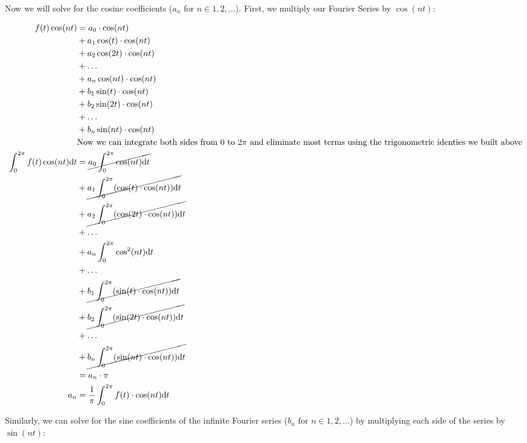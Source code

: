 \documentclass[10pt]{article} %
\begin{document}
Now we will solve for the cosine coefficients ($a_n \text{ for } n \in 1, 2, \dots$). First, we multiply our Fourier Series by $\cos(nt)$:

\begin{align}
    f(t)\cos(nt) & = a_0 \cdot \cos(nt) \\& + a_1\cos(t) \cdot \cos(nt) \\& + a_2\cos(2t) \cdot \cos(nt) \\& + \dots \\& + a_n\cos(nt) \cdot \cos(nt) \\& + b_1\sin(t) \cdot \cos(nt) \\& + b_2\sin(2t) \cdot \cos(nt) \\& + \dots \\& + b_n\sin(nt) \cdot \cos(nt)\\
    &\text{Now we can integrate both sides from $0$ to $2\pi$ and eliminate most terms using the trigonometric identies we built above}\\
    \int_0^{2\pi}f(t)\cos(nt)\mathrm{d}t & = \cancel{a_0 \int_0^{2\pi} \cos(nt) \mathrm{d}t} \\& + \cancel{a_1\int_0^{2\pi}(\cos(t) \cdot \cos(nt)) \mathrm{d}t} \\& + \cancel{a_2\int_0^{2\pi}(\cos(2t) \cdot \cos(nt)) \mathrm{d}t} \\& + \dots \\& + a_n\int_0^{2\pi} \cos^2(nt) \mathrm{d}t \\& + \dots \\& + \cancel{b_1\int_0^{2\pi}(\sin(t) \cdot \cos(nt)) \mathrm{d}t} \\& + \cancel{b_2\int_0^{2\pi}(\sin(2t) \cdot \cos(nt)) \mathrm{d}t} \\& + \dots \\& + \cancel{b_n\int_0^{2\pi}(\sin(nt) \cdot \cos(nt)) \mathrm{d}t}\\
    & = a_n \cdot \pi \\
    a_n & = \frac1\pi \int_0^{2\pi} f(t) \cdot \cos(nt) \mathrm{d}t
\end{align}

Similarly, we can solve for the sine coefficients of the infinite Fourier series ($b_n \text{ for } n \in 1, 2, \dots$) by multiplying each side of the series by $\sin(nt)$:
\end{document}

